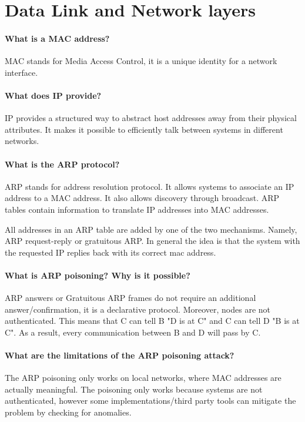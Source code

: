 \section{Data Link and Network layers}
\paragraph{What is a MAC address?}
MAC stands for Media Access Control, it is a unique identity for a network interface. 

\paragraph{What does IP provide?}
IP provides a structured way to abstract host addresses away from their physical attributes. It makes it possible to efficiently talk between systems in different networks.

\paragraph{What is the ARP protocol?}
ARP stands for address resolution protocol. It allows systems to associate an IP address to a MAC address. It also allows discovery through broadcast. ARP tables contain information to translate IP addresses into MAC addresses.

All addresses in an ARP table are added by one of the two mechanisms. Namely, ARP request-reply or gratuitous ARP. In general the idea is that the system with the requested IP replies back with its correct mac address.

\paragraph{What is ARP poisoning? Why is it possible?}
ARP answers or Gratuitous ARP frames do not require an additional answer/confirmation, it is a declarative protocol. Moreover, nodes are not authenticated. This means that C can tell B "D is at C" and C can tell D "B is at C". As a result, every communication between B and D will pass by C.  

\paragraph{What are the limitations of the ARP poisoning attack?}
The ARP poisoning only works on local networks, where MAC addresses are actually meaningful. The poisoning only works because systems are not authenticated, however some implementations/third party tools can mitigate the problem by checking for anomalies.

